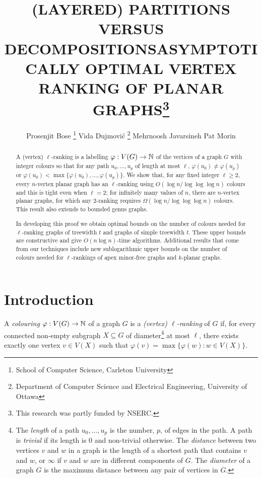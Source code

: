 \documentclass[kpfonts]{patmorin}
\title{\MakeUppercase{(Layered) Partitions versus Decompositions}}
\author{}
\title{\MakeUppercase{Asymptotically Optimal Vertex Ranking of Planar Graphs}\thanks{This research was partly funded by NSERC.}}
\author{Prosenjit Bose%
    \thanks{School of Computer Science, Carleton University}\quad
    Vida Dujmović%
    \thanks{Department of Computer Science and Electrical Engineering, University of Ottawa}\quad
    Mehrnoosh Javarsineh\footnotemark[2]  \quad
    Pat Morin\footnotemark[2]}
\theoremstyle{named}
\begin{document}
\begin{titlepage}
\maketitle

\begin{abstract}
  A (vertex) $\ell$-ranking is a labelling $\varphi:V(G)\to\mathbb{N}$ of the vertices of a graph $G$ with integer colours so that for any path $u_0,\ldots,u_p$ of length at most $\ell$, $\varphi(u_0)\neq\varphi(u_p)$ or $\varphi(u_0)<\max\{\varphi(u_0),\ldots,\varphi(u_p)\}$.  We show that, for any fixed integer $\ell\ge 2$, every $n$-vertex planar graph has an $\ell$-ranking using $O(\log n/\log\log\log n)$ colours and this is tight even when $\ell=2$; for infinitely many values of $n$, there are $n$-vertex planar graphs, for which any 2-ranking requires $\Omega(\log n/\log\log\log n)$ colours.  This result also extends to bounded genus graphs.

  In developing this proof we obtain optimal bounds on the number of colours needed for $\ell$-ranking graphs of treewidth $t$ and graphs of simple treewidth $t$.  These upper bounds are constructive and give $O(n\log n)$-time algorithms.  Additional results that come from our techniques include new sublogarithmic upper bounds on the number of colours needed for $\ell$-rankings of apex minor-free graphs and $k$-planar graphs.
\end{abstract}
\end{titlepage}

%
{}

\section{Introduction}


A \emph{colouring} $\varphi:V(G)\to \mathbb{N}$ of a graph $G$ is a \emph{(vertex) $\ell$-ranking} of $G$ if, for every connected non-empty subgraph $X\subseteq G$ of diameter\footnote{The \emph{length} of a path $u_0,\ldots,u_p$ is the number, $p$, of edges in the path. A path is \emph{trivial} if its length is 0 and non-trivial otherwise. The \emph{distance} between two vertices $v$ and $w$ in a graph is the length of a shortest path that contains $v$ and $w$, or $\infty$ if $v$ and $w$ are in different components of $G$. The \emph{diameter} of a graph $G$ is the maximum distance between any pair of vertices in $G$.}  at most $\ell$, there exists exactly one vertex $v\in V(X)$ such that $\varphi(v)=\max\{\varphi(w):w\in V(X)\}$.
\end{document}
